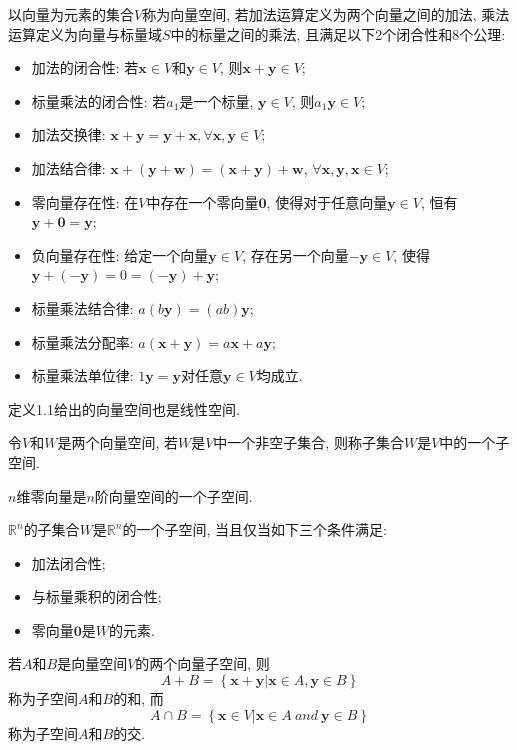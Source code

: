 \documentclass[lang=cn,10pt]{gorgeousnbook}
\numberwithin{equation}{section}%
\numberwithin{figure}{section}%
\begin{document}
\begin{definition}[向量空间]
以向量为元素的集合$V$称为向量空间, 若加法运算定义为两个向量之间的加法, 乘法运算定义为向量与标量域$S$中的标量之间的乘法, 且满足以下2个闭合性和8个公理:
\begin{itemize}
\item 加法的闭合性: 若$\boldsymbol{x}\in V$和$\boldsymbol{y}\in V$, 则$\boldsymbol{x}+\boldsymbol{y}\in V$;
\item 标量乘法的闭合性: 若$a_1$是一个标量, $\boldsymbol{y}\in V$, 则$a_1\boldsymbol{y}\in V$;
\item 加法交换律: $\boldsymbol{x}+\boldsymbol{y} = \boldsymbol{y}+\boldsymbol{x}, \forall \boldsymbol{x},\boldsymbol{y} \in V $;
\item 加法结合律: $\boldsymbol{x}+(\boldsymbol{y}+\boldsymbol{w}) = (\boldsymbol{x}+\boldsymbol{y})+\boldsymbol{w} $, $\forall \boldsymbol{x},\boldsymbol{y},\boldsymbol{x} \in V$;
\item 零向量存在性: 在$V$中存在一个零向量$\boldsymbol{0}$, 使得对于任意向量$\boldsymbol{y}\in V$, 恒有$\boldsymbol{y}+\boldsymbol{0} = \boldsymbol{y}$;
\item 负向量存在性: 给定一个向量$\boldsymbol{y}\in V$, 存在另一个向量$-\boldsymbol{y}\in V$, 使得$\boldsymbol{y}+(-\boldsymbol{y})=0=(-\boldsymbol{y})+\boldsymbol{y}$;
\item 标量乘法结合律: $a(b\boldsymbol{y})=(ab)\boldsymbol{y}$;
\item 标量乘法分配率: $a(\boldsymbol{x}+\boldsymbol{y})= a\boldsymbol{x}+a\boldsymbol{y}$;
\item 标量乘法单位律: $1\boldsymbol{y}=\boldsymbol{y}$对任意$\boldsymbol{y}\in V$均成立.
\end{itemize}
\end{definition}
定义1.1给出的向量空间也是线性空间. 
\begin{definition}
令$V$和$W$是两个向量空间, 若$W$是$V$中一个非空子集合, 则称子集合$W$是$V$中的一个子空间. 
\end{definition}
$n$维零向量是$n$阶向量空间的一个子空间. 
\begin{theorem}
$\mathbb{R}^{n}$的子集合$W$是$\mathbb{R}^{n}$的一个子空间, 当且仅当如下三个条件满足:
\begin{itemize}
\item 加法闭合性;
\item 与标量乘积的闭合性;
\item 零向量$\boldsymbol{0}$是$W$的元素.
\end{itemize}
\end{theorem}
\begin{definition}
若$A$和$B$是向量空间$V$的两个向量子空间, 则
\begin{equation}
A+B=\left\{ \boldsymbol{x}+\boldsymbol{y}\left| \boldsymbol{x}\in A,\boldsymbol{y}\in B \right. \right\} 
\end{equation}
称为子空间$A$和$B$的和, 而
\begin{equation}
A\cap B=\left\{ \boldsymbol{x}\in V\left| \boldsymbol{x}\in A\  and\  \boldsymbol{y}\in B \right. \right\} 
\end{equation}
称为子空间$A$和$B$的交. 
\end{definition}
\end{document}
